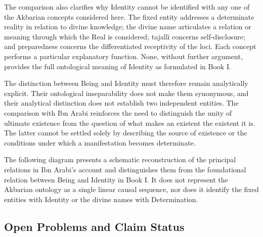 \label{para:VS.B01.P01.C08.S16.SS17.P002}

The comparison also clarifies why Identity
cannot be identified with any one of the
Akbarian concepts considered here. The
fixed entity addresses a determinate reality
in relation to divine knowledge; the divine
name articulates a relation or meaning
through which the Real is considered;
tajalli concerns self-disclosure; and
preparedness concerns the differentiated
receptivity of the loci. Each concept
performs a particular explanatory function.
None, without further argument, provides
the full ontological meaning of Identity
as formulated in Book I.

\label{para:VS.B01.P01.C08.SS17.P003}

The distinction between Being and Identity
must therefore remain analytically explicit.
Their ontological inseparability does not
make them synonymous, and their analytical
distinction does not establish two independent
entities. The comparison with Ibn Arabi
reinforces the need to distinguish the
unity of ultimate existence from the
question of what makes an existent the
existent it is. The latter cannot be
settled solely by describing the source
of existence or the conditions under
which a manifestation becomes determinate.

\label{para:VS.B01.P01.C08.S16.SS17.P004}

The following diagram presents a schematic
reconstruction of the principal relations
in Ibn Arabi's account and distinguishes
them from the foundational relation
between Being and Identity in Book I.
It does not represent the Akbarian ontology
as a single linear causal sequence, nor
does it identify the fixed entities with
Identity or the divine names with
Determination.





\subsection{Open Problems and Claim Status}
\label{subsec:ch08_s16_ss18}

